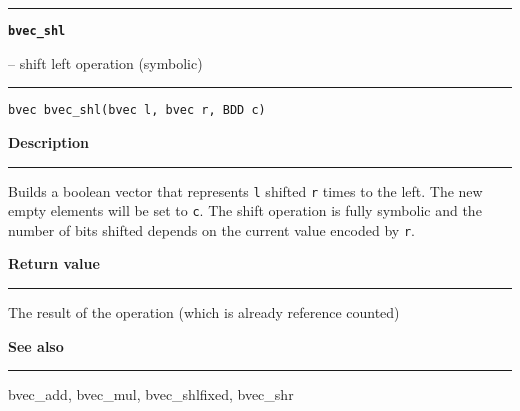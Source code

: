 \begin{minipage}{\textwidth}

\noindent\begin{minipage}{\textwidth}
\rule{\textwidth}{0.5mm}
{\tt\bf bvec\_shl }
\--- shift left operation (symbolic)  \hspace{\fill}
\\\rule[1.5ex]{\textwidth}{0.5mm}
\end{minipage}

\noindent\begin{verbatim}
bvec bvec_shl(bvec l, bvec r, BDD c) 
\end{verbatim}

\vspace{\parsep}\noindent
{\bf Description}\\\rule[1.5ex]{\textwidth}{0.2mm}\vspace{-1.5ex}\setlength{\parindent}{1em}
Builds a boolean vector that represents {\tt l} shifted {\tt r}
           times to the left. The new empty elements will be set to {\tt c}.
	   The shift operation is fully symbolic and the number of bits
	   shifted depends on the current value encoded by {\tt r}. 

\setlength{\parindent}{0em}\vspace{\parsep}\vspace{\baselineskip}\noindent
{\bf Return value}\\\rule[1.5ex]{\textwidth}{0.2mm}\vspace{-1.5ex}
The result of the operation (which is already reference counted) 

\vspace{\parsep}\vspace{\baselineskip}\noindent
{\bf See also}\\\rule[1.5ex]{\textwidth}{0.2mm}\vspace{-1.5ex}
bvec\_add, bvec\_mul, bvec\_shlfixed, bvec\_shr 
\end{minipage}
\vspace{8ex}
